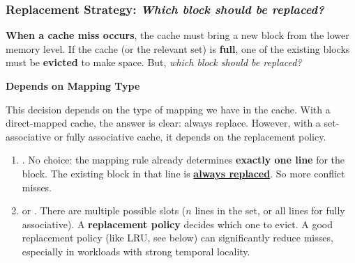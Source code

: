 \subsubsection{Replacement Strategy: \emph{Which block should be replaced?}}\label{subsubsection: Replacement strategy}

\textbf{When a cache miss occurs}, the cache must bring a new block from the lower memory level. If the cache (or the relevant set) is \textbf{full}, one of the existing blocks must be \textbf{evicted} to make space. But, \emph{which block should be replaced?}

\highspace
\begin{flushleft}
    \textcolor{Green3}{ \textbf{Depends on Mapping Type}}
\end{flushleft}
This decision depends on the type of mapping we have in the cache. With a direct-mapped cache, the answer is clear: always replace. However, with a set-associative or fully associative cache, it depends on the replacement policy.
\begin{enumerate}
    \item {}. No choice: the mapping rule already determines \textbf{exactly one line} for the block. The existing block in that line is \textbf{\underline{always replaced}}. So more conflict misses.
    \item {} or . There are multiple possible slots ($n$ lines in the set, or all lines for fully associative). A \textbf{replacement policy} decides which one to evict. A good replacement policy (like LRU, see below) can significantly reduce misses, especially in workloads with strong temporal locality.
\end{enumerate}

